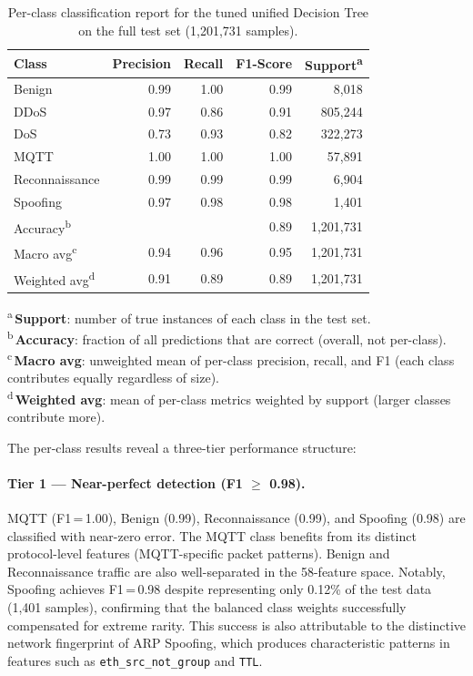 \begin{table}[H]
\centering
\caption{Per-class classification report for the tuned unified Decision Tree on the full test set (1,201,731 samples).}
\label{tab:dt-perclass-unified}
\small
\begin{tabular}{@{}l r r r r@{}}
\toprule
\textbf{Class} & \textbf{Precision} & \textbf{Recall} & \textbf{F1-Score} & \textbf{Support}\textsuperscript{a} \\
\midrule
Benign          & 0.99 & 1.00 & 0.99 &     8,018 \\
DDoS            & 0.97 & 0.86 & 0.91 &   805,244 \\
DoS             & 0.73 & 0.93 & 0.82 &   322,273 \\
MQTT            & 1.00 & 1.00 & 1.00 &    57,891 \\
Reconnaissance  & 0.99 & 0.99 & 0.99 &     6,904 \\
Spoofing        & 0.97 & 0.98 & 0.98 &     1,401 \\
\midrule
Accuracy\textsuperscript{b}        &      &      & 0.89 & 1,201,731 \\
Macro avg\textsuperscript{c}       & 0.94 & 0.96 & 0.95 & 1,201,731 \\
Weighted avg\textsuperscript{d}    & 0.91 & 0.89 & 0.89 & 1,201,731 \\
\bottomrule
\end{tabular}

\vspace{0.4em}
\raggedright\footnotesize
\textsuperscript{a}\,\textbf{Support}: number of true instances of each class in the test set.\\
\textsuperscript{b}\,\textbf{Accuracy}: fraction of all predictions that are correct (overall, not per-class).\\
\textsuperscript{c}\,\textbf{Macro avg}: unweighted mean of per-class precision, recall, and F1 (each class contributes equally regardless of size).\\
\textsuperscript{d}\,\textbf{Weighted avg}: mean of per-class metrics weighted by support (larger classes contribute more).
\end{table}

The per-class results reveal a three-tier performance structure:

\paragraph{Tier 1 --- Near-perfect detection (F1 $\geq$ 0.98).}
MQTT (F1\,=\,1.00), Benign (0.99), Reconnaissance (0.99), and Spoofing (0.98) are classified with near-zero error. The MQTT class benefits from its distinct protocol-level features (MQTT-specific packet patterns). Benign and Reconnaissance traffic are also well-separated in the 58-feature space. Notably, Spoofing achieves F1\,=\,0.98 despite representing only 0.12\% of the test data (1,401 samples), confirming that the balanced class weights successfully compensated for extreme rarity. This success is also attributable to the distinctive network fingerprint of ARP Spoofing, which produces characteristic patterns in features such as \texttt{eth\_src\_not\_group} and \texttt{TTL}.

